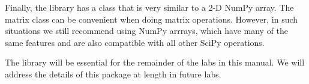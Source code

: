 Finally, the  library has a  class that is very 
similar to a 2-D NumPy array. The matrix class can be convenient when doing matrix 
operations. However, in such situations we still recommend using NumPy arrrays, which have many of the same features and are also compatible with all other SciPy operations.

The  library will be essential for the remainder of the labs in this manual. We will address the details of this package at length in future labs. 

